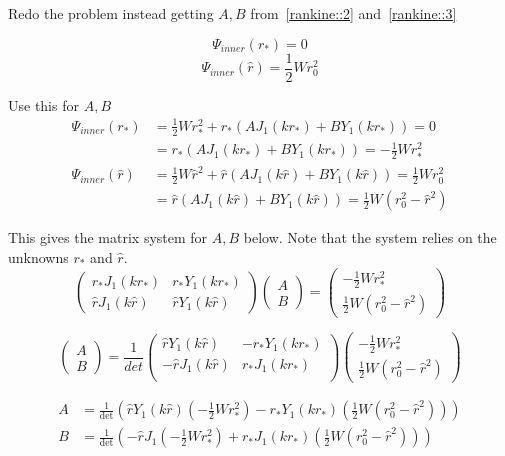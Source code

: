 \documentclass{X:/Documents/Coding/Latex/myreport}
\begin{document}
Redo the problem instead getting $A,B$ from~\ref{rankine::2} and~\ref{rankine::3}

\[\Psi_{inner}(r_*) = 0\]
\[\Psi_{inner}(\hat{r}) = \frac12 W r_0^2\]




Use this for $A,B$
\begin{align*}
    \Psi_{inner}(r_*) &= \frac12 Wr_*^2 +r_*(AJ_1(kr_*) + BY_1(kr_*)) =0\\
    &=r_*(AJ_1(kr_*) + BY_1(kr_*)) =-\frac12 Wr_*^2\\
    \Psi_{inner}(\hat{r}) &= \frac12 W\hat{r}^2  +\hat{r}(AJ_1(k\hat{r}) + BY_1(k\hat{r})) =\frac12 W r_0^2\\
    &=\hat{r}(AJ_1(k\hat{r}) + BY_1(k\hat{r})) =\frac12 W (r_0^2 - \hat{r}^2)
\end{align*}

This gives the matrix system for $A,B$ below. Note that the system relies on the unknowns $r_*$ and $\hat{r}$.
\[\begin{pmatrix}
    r_*J_1(kr_*) & r_*Y_1(kr_*)\\
    \hat{r} J_1(k\hat{r}) & \hat{r} Y_1(k\hat{r})
\end{pmatrix}
\begin{pmatrix}
    A\\B
\end{pmatrix} = \begin{pmatrix}
    - \frac12 Wr_*^2\\
    \frac12 W (r_0^2 - \hat{r}^2)
\end{pmatrix}\]


\[
\begin{pmatrix}
    A\\B
\end{pmatrix} = \frac{1}{det}\begin{pmatrix}
     \hat{r} Y_1(k\hat{r})& -r_*Y_1(kr_*)\\
    -\hat{r} J_1(k\hat{r}) & r_*J_1(kr_*)\\
\end{pmatrix}\begin{pmatrix}
    - \frac12 Wr_*^2\\
    \frac12 W (r_0^2 - \hat{r}^2)
\end{pmatrix}\]

\begin{align*}
    A &= \frac{1}{\det} \left(\hat{r} Y_1(k\hat{r})\left(-\frac12 Wr_*^2\right) - r_*Y_1(kr_*) \left(\frac12 W(r_0^2 - \hat{r}^2)\right)\right)\\
    B &= \frac{1}{\det} \left(-\hat{r}J_1\left(-\frac12 Wr_*^2\right) + r_*J_1(kr_*) \left(\frac12 W(r_0^2 - \hat{r}^2)\right)\right)
\end{align*}
\end{document}
